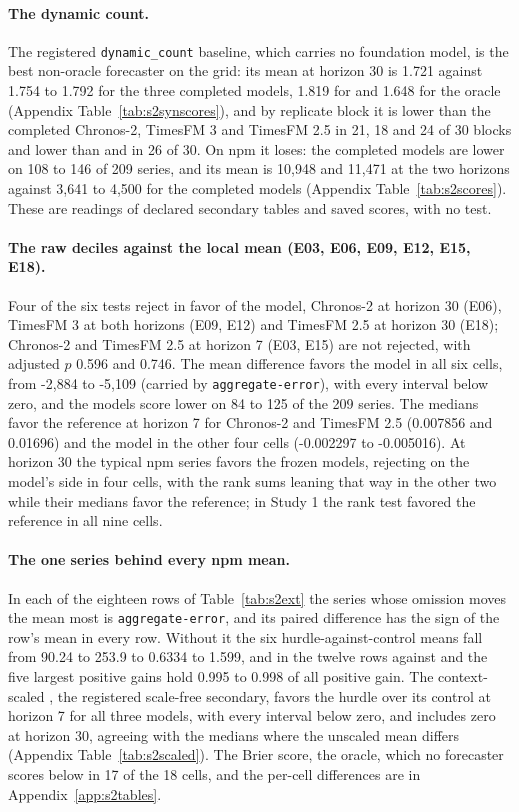\paragraph{The dynamic count.} The registered \texttt{dynamic\_count} baseline, which carries no foundation
model, is the best non-oracle forecaster on the grid: its mean \qs{} at horizon 30 is 1.721 against 1.754 to
1.792 for the three completed models, 1.819 for \hc{} and 1.648 for the oracle (Appendix
Table~\ref{tab:s2synscores}), and by replicate block it is lower than the completed Chronos-2, TimesFM 3 and
TimesFM 2.5 in 21, 18 and 24 of 30 blocks and lower than \hc{} and \lm{} in 26 of 30. On npm it loses: the
completed models are lower on 108 to 146 of 209 series, and its mean \qs{} is 10,948 and 11,471 at the two
horizons against 3,641 to 4,500 for the completed models (Appendix Table~\ref{tab:s2scores}). These are
readings of declared secondary tables and saved scores, with no test.

\paragraph{The raw deciles against the local mean (E03, E06, E09, E12, E15, E18).} Four of the six tests
reject in favor of the model, Chronos-2 at horizon 30 (E06), TimesFM 3 at both horizons (E09, E12) and
TimesFM 2.5 at horizon 30 (E18); Chronos-2 and TimesFM 2.5 at horizon 7 (E03, E15) are not rejected, with
adjusted $p$ 0.596 and 0.746. The mean difference favors the model in all six cells, from -2,884 to -5,109
(carried by \texttt{aggregate-error}), with every interval below zero, and the models score lower on 84 to
125 of the 209 series. The medians favor the reference at horizon 7 for Chronos-2 and TimesFM 2.5 (0.007856
and 0.01696) and the model in the other four cells (-0.002297 to -0.005016). At horizon 30 the typical npm
series favors the frozen models, rejecting on the model's side in four cells, with the rank sums leaning that
way in the other two while their medians favor the reference; in Study 1 the rank test favored the reference
in all nine cells.

\paragraph{The one series behind every npm mean.} In each of the eighteen rows of Table~\ref{tab:s2ext}
the series whose omission moves the mean most is \texttt{aggregate-error}, and its paired difference has the
sign of the row's mean in every row. Without it the six hurdle-against-control means fall from 90.24 to
253.9 to 0.6334 to 1.599, and in the twelve rows against \hc{} and \lm{} the five largest positive gains
hold 0.995 to 0.998 of all positive gain. The context-scaled \qs{}, the registered scale-free secondary,
favors the hurdle over its control at horizon 7 for all three models, with every interval below zero, and
includes zero at horizon 30, agreeing with the medians where the unscaled mean differs (Appendix
Table~\ref{tab:s2scaled}). The Brier score, the oracle, which no forecaster scores below in 17 of the 18
cells, and the per-cell differences are in Appendix~\ref{app:s2tables}.

